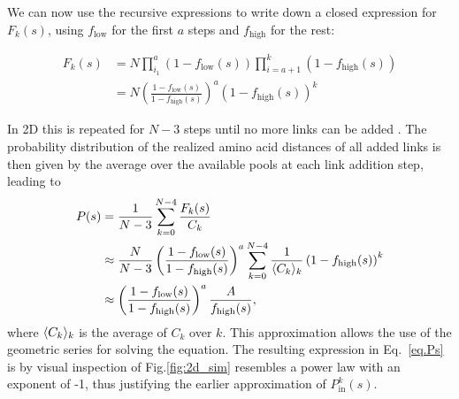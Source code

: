 \documentclass[
reprint,
twocolumn,
amsmath,amssymb,superscriptaddress,aps,
pre]{revtex4-1}
\newcommand{\red}[1]{\textcolor{red!80!black}{#1}}
\DeclarePairedDelimiter{\evdel}{\langle}{\rangle}
\newcommand{\Pin}{P_{\mathrm{in}}}
\newcommand{\fhigh}{f_{\mathrm{high}}}
\newcommand{\flow}{f_{\mathrm{low}}}
\begin{document}
We can now use the recursive expressions to write down a closed expression for $F_k(s)$, using $\flow$ for the first $a$ steps and $\fhigh$ for the rest:

\begin{align}
    F_k(s)&=N\prod_{i_1}^a\left(1-\flow(s)\right)\prod_{i=a+1}^k\left(1-\fhigh(s)\right) \nonumber \\
    &= N\left(\frac{1-\flow(s)}{1-\fhigh(s)}\right)^a\left(1-\fhigh(s)\right)^{k}
\end{align}

In 2D this is repeated for $N-3$ steps until no more links can be added \cite{molkenthin2016scaling}.
The probability distribution of the realized amino acid distances of all added links is then given by the average over the available pools at each link addition step, leading to
\begin{align}
    P(s)&=\frac{1}{N-3}\sum_{k=0}^{N-4} \frac{F_k(s)}{C_k} \nonumber \\
    &\approx \frac{N}{N-3}\left(\frac{1-\flow(s)}{1-\fhigh(s)}\right)^a
\sum_{k=0}^{N-4} \frac{1}{\evdel{C_k}_k} \left(1-\fhigh(s)\right)^{k} \nonumber \\
    &\approx \left(\frac{1-\flow(s)}{1-\fhigh(s)}\right)^a\frac{A}{\fhigh(s)},
    \label{eq.Ps}
\end{align}
where $\evdel{C_k}_k$ is the average of $C_k$ over $k$.
This approximation allows the use of the geometric series for solving the equation. 
The resulting expression in Eq.~\ref{eq.Ps} is by visual inspection of Fig.\ref{fig:2d_sim} resembles a power law with an exponent of -1, thus justifying the earlier approximation of $\Pin^k(s)$.
\end{document}
